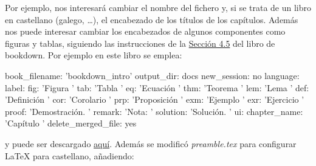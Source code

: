 \documentclass[]{book}
\newenvironment{Shaded}{\begin{snugshade}}{\end{snugshade}}
\newcommand{\StringTok}[1]{\textcolor[rgb]{0.31,0.60,0.02}{#1}}
\newcommand{\CommentTok}[1]{\textcolor[rgb]{0.56,0.35,0.01}{\textit{#1}}}
\newcommand{\FunctionTok}[1]{\textcolor[rgb]{0.00,0.00,0.00}{#1}}
\newcommand{\BuiltInTok}[1]{#1}
\newcommand{\ExtensionTok}[1]{#1}
\newcommand{\AttributeTok}[1]{\textcolor[rgb]{0.77,0.63,0.00}{#1}}
\newcommand{\NormalTok}[1]{#1}
\theoremstyle{definition}
\theoremstyle{definition}
\theoremstyle{definition}
\theoremstyle{remark}
\begin{document}
Por ejemplo, nos interesará cambiar el nombre del fichero y, si se trata
de un libro en castellano (galego, \ldots{}), el encabezado de los
títulos de los capítulos. Además nos puede interesar cambiar los
encabezados de algunos componentes como figuras y tablas, siguiendo las
instrucciones de la
\href{https://bookdown.org/yihui/bookdown/internationalization.html}{Sección
4.5} del libro de bookdown. Por ejemplo en este libro se emplea:

\begin{Shaded}
\begin{Highlighting}[]
\FunctionTok{book_filename:}\AttributeTok{ }\StringTok{'bookdown_intro'}
\FunctionTok{output_dir:}\AttributeTok{ docs}
\FunctionTok{new_session:}\AttributeTok{ no}
\FunctionTok{language:}
  \FunctionTok{label:}
    \FunctionTok{fig:}\AttributeTok{ }\StringTok{'Figura '}
    \FunctionTok{tab:}\AttributeTok{ }\StringTok{'Tabla '}
    \FunctionTok{eq:}\AttributeTok{ }\StringTok{'Ecuación '}
    \FunctionTok{thm:}\AttributeTok{ }\StringTok{'Teorema '}
    \FunctionTok{lem:}\AttributeTok{ }\StringTok{'Lema '}
    \FunctionTok{def:}\AttributeTok{ }\StringTok{'Definición '}
    \FunctionTok{cor:}\AttributeTok{ }\StringTok{'Corolario '}
    \FunctionTok{prp:}\AttributeTok{ }\StringTok{'Proposición '}
    \FunctionTok{exm:}\AttributeTok{ }\StringTok{'Ejemplo '}
    \FunctionTok{exr:}\AttributeTok{ }\StringTok{'Ejercicio '}
    \FunctionTok{proof:}\AttributeTok{ }\StringTok{'Demostración. '}
    \FunctionTok{remark:}\AttributeTok{ }\StringTok{'Nota: '}
    \FunctionTok{solution:}\AttributeTok{ }\StringTok{'Solución. '}
  \FunctionTok{ui:}
    \FunctionTok{chapter_name:}\AttributeTok{ }\StringTok{'Capítulo '}
\FunctionTok{delete_merged_file:}\AttributeTok{ yes}
\end{Highlighting}
\end{Shaded}

y puede ser descargado
\href{https://github.com/rubenfcasal/bookdown_intro/raw/master/_bookdown.yml}{aquí}.
Además se modificó \emph{preamble.tex} para configurar LaTeX para
castellano, añadiendo:

\begin{Shaded}
\end{Shaded}
\end{document}
